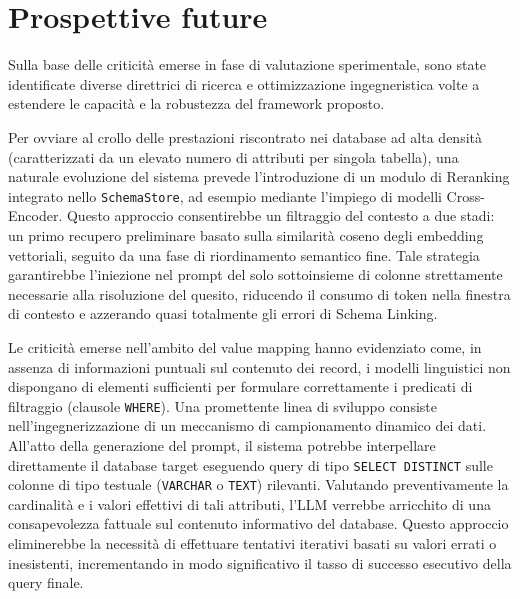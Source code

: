 \section{Prospettive future}\label{prospettive-future}

Sulla base delle criticità emerse in fase di valutazione sperimentale,
sono state identificate diverse direttrici di ricerca e ottimizzazione
ingegneristica volte a estendere le capacità e la robustezza del
framework proposto.

Per ovviare al crollo delle prestazioni riscontrato nei database ad alta
densità (caratterizzati da un elevato numero di attributi per singola
tabella), una naturale evoluzione del sistema prevede l'introduzione di
un modulo di Reranking integrato nello \texttt{SchemaStore}, ad
esempio mediante l'impiego di modelli Cross-Encoder. Questo approccio
consentirebbe un filtraggio del contesto a due stadi: un primo recupero
preliminare basato sulla similarità coseno degli embedding vettoriali,
seguito da una fase di riordinamento semantico fine. Tale strategia
garantirebbe l'iniezione nel prompt del solo sottoinsieme di colonne
strettamente necessarie alla risoluzione del quesito, riducendo il consumo di token nella finestra di contesto e
azzerando quasi totalmente gli errori di Schema Linking.

Le criticità emerse nell'ambito del value mapping hanno
evidenziato come, in assenza di informazioni puntuali sul contenuto dei
record, i modelli linguistici non dispongano di elementi sufficienti per
formulare correttamente i predicati di filtraggio (clausole
\texttt{WHERE}). Una promettente linea di sviluppo consiste
nell'ingegnerizzazione di un meccanismo di campionamento dinamico dei
dati. All'atto della generazione del prompt, il sistema potrebbe
interpellare direttamente il database target eseguendo query di tipo
\texttt{SELECT\ DISTINCT} sulle colonne di tipo testuale
(\texttt{VARCHAR} o \texttt{TEXT}) rilevanti. Valutando preventivamente
la cardinalità e i valori effettivi di tali attributi, l'LLM verrebbe
arricchito di una consapevolezza fattuale sul contenuto informativo del
database. Questo approccio eliminerebbe la necessità di effettuare
tentativi iterativi basati su valori errati o inesistenti, incrementando
in modo significativo il tasso di successo esecutivo della query finale.
